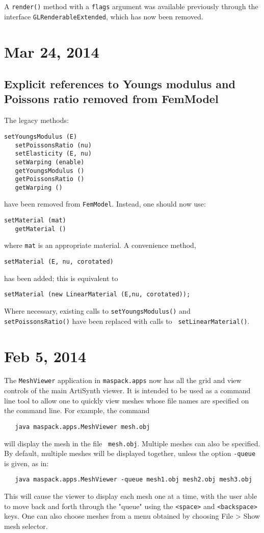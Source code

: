 \documentclass{article}
\begin{document}
A {\tt render()} method with a {\tt flags} argument was available
previously through the interface {\tt GLRenderableExtended}, which has
now been removed.

\section*{Mar 24, 2014}

\subsection*{Explicit references to Youngs modulus and Poissons ratio 
removed from FemModel}

The legacy methods: 
\begin{lstlisting}[]
   setYoungsModulus (E)
   setPoissonsRatio (nu)
   setElasticity (E, nu)
   setWarping (enable)
   getYoungsModulus ()
   getPoissonsRatio ()
   getWarping ()
\end{lstlisting}
have been removed from {\tt FemModel}. Instead, one should now use:
\begin{lstlisting}[]
   setMaterial (mat)
   getMaterial ()
\end{lstlisting}
where {\tt mat} is an appropriate material.
A convenience method, 
\begin{lstlisting}[]
   setMaterial (E, nu, corotated)
\end{lstlisting}
has been added; this is equivalent to
\begin{lstlisting}[]
   setMaterial (new LinearMaterial (E,nu, corotated));
\end{lstlisting}

Where necessary, existing calls to {\tt setYoungsModulus()} and {\tt
setPoissonsRatio()} have been replaced with calls to {\tt
setLinearMaterial()}.

\section*{Feb 5, 2014}

The {\tt MeshViewer} application in {\tt maspack.apps} now has all the
grid and view controls of the main ArtiSynth viewer. It is intended to
be used as a command line tool to allow one to quickly view
meshes whose file names are specified on the command line.
For example, the command
\begin{verbatim}
   java maspack.apps.MeshViewer mesh.obj 
\end{verbatim}
will display the mesh in the file {\tt
mesh.obj}. Multiple meshes can also be specified. By default,
multiple meshes will be displayed together, 
unless the option {\tt -queue} is given, as in:
\begin{verbatim}
   java maspack.apps.MeshViewer -queue mesh1.obj mesh2.obj mesh3.obj 
\end{verbatim}
This will cause the viewer to display each mesh one at a time, with
the user able to move back and forth through the "queue" using the
{\tt <space>} and {\tt <backspace>} keys. One can also choose meshes
from a menu obtained by choosing {\sf File > Show mesh selector}.
\end{document}
